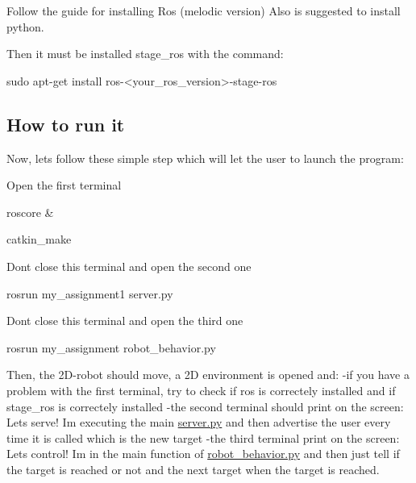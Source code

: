 Follow the guide for installing Ros (melodic version) Also is suggested to install python.

Then it must be installed stage\+\_\+ros with the command\+: 
\begin{DoxyCode}
sudo apt-get install ros-<your\_ros\_version>-stage-ros
\end{DoxyCode}


\subsection*{How to run it}

Now, let\textquotesingle{}s follow these simple step which will let the user to launch the program\+:

Open the first terminal


\begin{DoxyCode}
roscore &
\end{DoxyCode}



\begin{DoxyCode}
catkin\_make
\end{DoxyCode}





Don\textquotesingle{}t close this terminal and open the second one


\begin{DoxyCode}
rosrun my\_assignment1 server.py
\end{DoxyCode}


Don\textquotesingle{}t close this terminal and open the third one


\begin{DoxyCode}
rosrun my\_assignment robot\_behavior.py
\end{DoxyCode}


Then, the 2\+D-\/robot should move, a 2D environment is opened and\+: -\/if you have a problem with the first terminal, try to check if ros is correctely installed and if stage\+\_\+ros is correctely installed -\/the second terminal should print on the screen\+: \textquotesingle{}Let\textquotesingle{}s serve! I\textquotesingle{}m executing the main \hyperlink{server_8py}{server.\+py}\textquotesingle{} and then advertise the user every time it is called which is the new target -\/the third terminal print on the screen\+: \textquotesingle{}Let\textquotesingle{}s control! I\textquotesingle{}m in the main function of \hyperlink{robot__behavior_8py}{robot\+\_\+behavior.\+py}\textquotesingle{} and then just tell if the target is reached or not and the next target when the target is reached. 